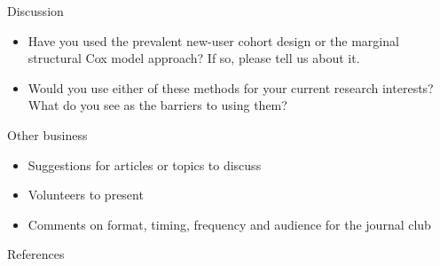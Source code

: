 \documentclass[aspectratio=169,12pt]{beamer} %
\begin{document}
\begin{frame}{Discussion}
    \begin{itemize}
	\item Have you used the prevalent new-user cohort design or the marginal structural Cox model approach? If so, please tell us about it.
    	\item Would you use either of these methods for your current research interests? What do you see as the barriers to using them?
    \end{itemize}
\end{frame}

\begin{frame}{Other business}
    \begin{itemize}
	\item Suggestions for articles or topics to discuss
	\item Volunteers to present
	\item Comments on format, timing, frequency and audience for the journal club
    \end{itemize}
\end{frame}

\begin{frame}{References}
        \tiny
        
\end{frame}
\end{document}
